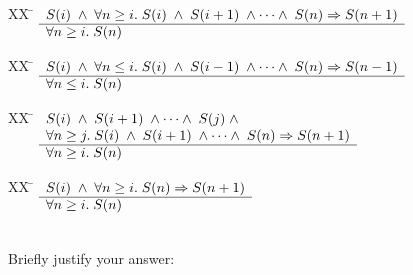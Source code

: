 \documentclass[addpoints]{exam}
\theoremstyle{definition}
\begin{document}
\begin{questions}
\begin{parts}
\begin{tabbing}
[a]XX \=  \kill
[a] \>
	\(\begin{array}[t]{l}
	S(i) \;\wedge\; \forall n \geq i.\;S(i)\;\wedge\;S(i+1)\;\wedge\cdots\wedge\;S(n) \Rightarrow S(n+1) \\
	\hline
	\forall n \geq i. \; S(n)
	\end{array}\)
\end{tabbing}

\begin{tabbing}
[b]XX \=  \kill
[b] \>
	\(\begin{array}[t]{l}
	S(i) \;\wedge\; \forall n \leq i.\;S(i)\;\wedge\;S(i-1)\;\wedge\cdots\wedge\;S(n) \Rightarrow S(n-1) \\
	\hline
	\forall n \leq i. \; S(n)
	\end{array}\)
\end{tabbing}


\begin{tabbing}
[c]XX \=  \kill
[c] \>
	\(\begin{array}[t]{l}
	S(i) \;\wedge\; S(i+1)\;\wedge\cdots\wedge\;S(j)\;\wedge\; \\
\forall n \geq j.\;S(i)\;\wedge\;S(i+1)\;\wedge\cdots\wedge\;S(n) \Rightarrow S(n+1) \\
	\hline
	\forall n \geq i. \; S(n)
	\end{array}\) %
\end{tabbing}

\begin{tabbing}
[d]XX \=  \kill
[d] \>
	\(\begin{array}[t]{l}
	S(i) \;\wedge\; \forall n \geq i.\;S(n) \Rightarrow S(n+1) \\
	\hline
	\forall n \geq i. \; S(n)
	\end{array}\) %
\end{tabbing}
~\\Briefly justify your answer:
\end{parts}




\vspace{25mm}
\clearpage



\vspace{25mm}



\vspace{25mm}


\end{questions}
\end{document}
